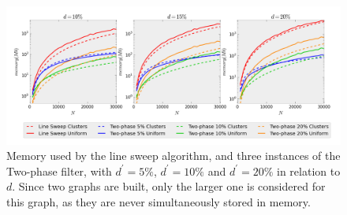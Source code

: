 \begin{figure}[!h]   
	\vspace{-10pt}
	\centering
	\includegraphics[width=\linewidth]{Pictures/ls_bp_s} 
	\caption[Memory used by Line Sweep and Two-phase filter algorithms..]{Memory used by the line sweep algorithm, and three instances of the Two-phase filter, with $d^\prime=5\%$, $d^\prime=10\%$ and $d^\prime=20\%$ in relation to $d$. Since two graphs are built, only the larger one is considered for this graph, as they are never simultaneously stored in memory.}
	\label{fig:ls_bp_s} 
\end{figure}